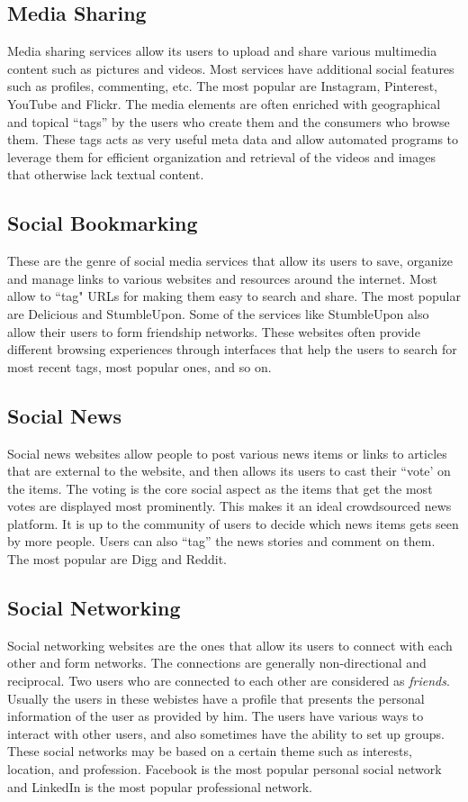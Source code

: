 \subsection{Media Sharing}
Media sharing services allow its users to upload and share various multimedia content such as pictures and videos. Most services have additional social features such as profiles, commenting, etc. The most popular are Instagram, Pinterest, YouTube and Flickr. The media elements are often enriched with geographical and topical ``tags'' by the users who create them and the consumers who browse them. These tags acts as very useful meta data and allow automated programs to leverage them for efficient organization and retrieval of the videos and images that otherwise lack textual content. 

\subsection{Social Bookmarking}
These are the genre of social media services that allow its users to save, organize and manage links to various websites and resources around the internet. Most allow to ``tag" URLs for making them easy to search and share. The most popular are Delicious and StumbleUpon. Some of the services like StumbleUpon also allow their users to form friendship networks. These websites often provide different browsing experiences through interfaces that help the users to search for most recent tags, most popular ones, and so on.

\subsection{Social News}
Social news websites allow people to post various news items or links to articles that are external to the website, and then allows its users to cast their ``vote' on the items. The voting is the core social aspect as the items that get the most votes are displayed most prominently. This makes it an ideal crowdsourced news platform. It is up to the community of users to decide which news items gets seen by more people. Users can also ``tag'' the news stories and comment on them. The most popular are Digg and Reddit.

\subsection{Social Networking}
Social networking websites are the ones that allow its users to connect with each other and form networks. The connections are generally non-directional and reciprocal. Two users who are connected to each other are considered as \textit{friends}. Usually the users in these webistes have a profile that presents the personal information of the user as provided by him. The users have various ways to interact with other users, and also sometimes have the ability to set up groups. These social networks may be based on a certain theme such as interests, location, and profession. Facebook is the most popular personal social network and LinkedIn is the most popular professional network.

